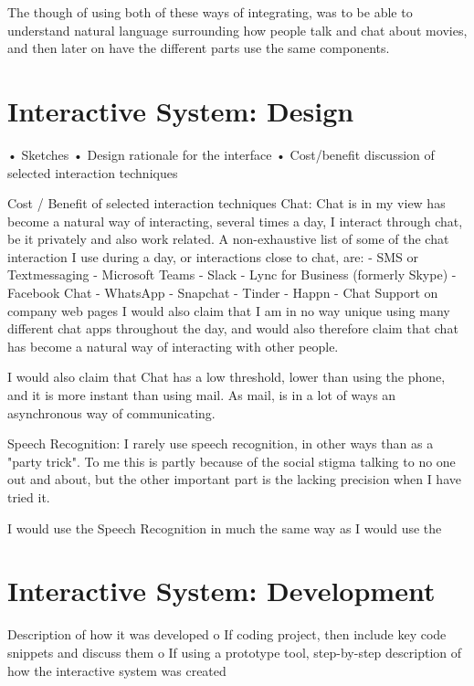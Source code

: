 \documentclass[11pt,fleqn]{book} %
\begin{document}
The though of using both of these ways of integrating, was to be able to understand natural language surrounding how people talk and chat about movies, and then later on have the different parts use the same components.




\chapter{Interactive System: Design}
•	Sketches
•	Design rationale for the interface
•	Cost/benefit discussion of selected interaction techniques

Cost / Benefit of selected interaction techniques
Chat:
Chat is in my view has become a natural way of interacting, several times a day, I interact through chat, be it privately and also work related. A non-exhaustive list of some of the chat interaction I use during a day, or interactions close to chat, are:
- SMS or Textmessaging
- Microsoft Teams
- Slack
- Lync for Business (formerly Skype)
- Facebook Chat
- WhatsApp
- Snapchat 
- Tinder
- Happn
- Chat Support on company web pages
I would also claim that I am in no way unique using many different chat apps throughout the day, and would also therefore claim that chat has become a natural way of interacting with other people.

I would also claim that Chat has a low threshold, lower than using the phone, and it is more instant than using mail. As mail, is in a lot of ways an asynchronous way of communicating.

Speech Recognition:
I rarely use speech recognition, in other ways than as a "party trick". To me this is partly because of the social stigma talking to no one out and about, but the other important part is the lacking precision when I have tried it.

I would use the Speech Recognition in much the same way as I would use the 


\chapter{Interactive System: Development}
Description of how it was developed
o	If coding project, then include key code snippets and discuss them
o	If using a prototype tool, step-by-step description of how the interactive system was created
\end{document}
